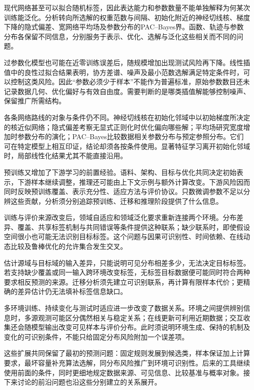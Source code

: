 现代网络甚至可以拟合随机标签，因此表达能力和参数数量不能单独解释为何某次训练能泛化。分析转向所选解的权重范数与间隔、初始化附近的神经切线核、梯度下降的隐式偏差、宽网络平均场及参数分布的PAC--Bayes界。函数、轨迹与参数分布各保留不同信息，分别服务于表示、优化、选解与泛化这些相关而不同的问题。

过参数化模型也可能在近零训练误差后，随规模增加出现测试风险再下降。线性插值中的良性过拟合结果表明，协方差谱、噪声及最小范数选解满足特定条件时，可以控制这类风险。因此“参数必须少于样本”不能作为普遍标准，原始参数数目还未记录数据几何、优化偏好与有效自由度。需要判断的是哪类插值解能够控制噪声、保留推广所需结构。

各条网络路线的对象与条件仍不同。神经切线核在初始化邻域中以初始梯度所决定的核近似网络；隐式偏差考察无显式正则化时优化偏向哪些解；平均场研究宽度增加时参数分布的演化；PAC--Bayes比较数据相关参数分布与预定参照分布。它们可在特定模型上相互印证，结论却须各按条件使用。显著特征学习离开初始化邻域时，局部线性化结果尤其不能直接沿用。

预训练又增加了下游学习的前置经验。语料、架构、目标与优化共同决定初始表示，下游样本继续调整，推理还可能由上下文示例与额外计算改变。下游风险因而同时反映预训练覆盖、表示充分性、适应方法与评价协议。只数微调参数不足以分辨这些贡献，分析须分别追踪预训练、迁移和推理阶段提供了什么信息。

训练与评价来源改变后，领域自适应和领域泛化要求重新连接两个环境。分布差异、覆盖、共享标签机制与共同错误等条件提供这种联系；缺少联系时，即使假设空间很小也可能无法识别目标标签。这个问题与因果可识别性、时间依赖、在线动态比较及鲁棒优化的允许集合发生交叉。

估计源域与目标域的输入差异，只能说明可见分布相差多少，无法决定目标标签。若支持缺少覆盖或同一输入跨环境改变标签，无标签目标数据便可能同时符合两种要求相反预测的来源。迁移分析须先建立可识别联系，再计算有限样本代价；更精确的差异估计仍无法填补标签信息缺口。

多环境训练、持续变化与测试时适应进一步改变了数据关系。环境之间提供辨别信息时，多源观测可能区分偶然相关与稳定关系；在线更新可利用近期数据；交互收集还会随模型输出改变可见样本与评价分布。此时须说明环境生成、保持的机制及变化的可识别条件，不能只给固定分布风险附加一个误差项。

这些扩展共同保留了最初的预测问题：固定规则发展到候选类，样本保证加上计算要求，最坏容量补充算法选解，同分布风险推广到环境可识别性。后来的工具继续使用前面的条件，同时更细地规定数据来源、可见信息、比较基准与概率对象。接下来讨论的前沿问题也沿这些分别建立的关系展开。

